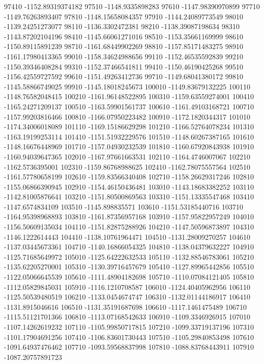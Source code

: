 {97410 -1152.89319374182
97510 -1148.9335898283
97610 -1147.98390970899
97710 -1149.76263893407
97810 -1148.15658084357
97910 -1144.24089773549
98010 -1139.24251273077
98110 -1136.3302472381
98210 -1138.39087198634
98310 -1143.87202104196
98410 -1145.66061271016
98510 -1153.35661169999
98610 -1150.89115891239
98710 -1161.68449902269
98810 -1157.85171483275
98910 -1161.17980413365
99010 -1158.34624988656
99110 -1152.46535592839
99210 -1150.39346408284
99310 -1152.37466541811
99410 -1150.46190425268
99510 -1156.42559727592
99610 -1151.49263412736
99710 -1149.68041380172
99810 -1145.58866749025
99910 -1145.18018245673
100010 -1149.83679132225
100110 -1148.76582048415
100210 -1161.96148522895
100310 -1159.63559274001
100410 -1165.24271209137
100510 -1163.59901561737
100610 -1161.49103168721
100710 -1157.99203816466
100810 -1166.07950223482
100910 -1172.1820344317
101010 -1174.34006018089
101110 -1169.15186629298
101210 -1166.52764078234
101310 -1163.19199253114
101410 -1151.51932229576
101510 -1148.60267387165
101610 -1148.16676448969
101710 -1157.04930232539
101810 -1160.67920843938
101910 -1160.94039647365
102010 -1167.97661663531
102110 -1164.4746007067
102210 -1162.5736395001
102310 -1159.86768988625
102410 -1162.78075557564
102510 -1161.57780658199
102610 -1159.83566340408
102710 -1158.26629317246
102810 -1155.06866390945
102910 -1154.46150436481
103010 -1143.18683382252
103110 -1142.81005876641
103210 -1151.80500869563
103310 -1151.13335547468
103410 -1147.6574834109
103510 -1145.898835571
103610 -1151.53185440716
103710 -1164.95398968893
103810 -1161.87356957168
103910 -1157.95822957249
104010 -1156.50609135034
104110 -1151.82875288926
104210 -1147.50596873897
104310 -1146.1222614443
104410 -1138.10761964471
104510 -1131.28009270257
104610 -1137.03445673361
104710 -1140.16866054325
104810 -1138.04379632227
104910 -1125.71685649972
105010 -1125.64222632533
105110 -1132.88546783061
105210 -1135.62205270001
105310 -1130.39716457679
105410 -1127.89965442856
105510 -1122.05066645539
105610 -1111.48904182698
105710 -1110.07084121405
105810 -1112.05829845031
105910 -1116.1210708587
106010 -1124.40405962956
106110 -1125.50539480519
106210 -1133.0454674747
106310 -1132.01144186917
106410 -1131.8915046616
106510 -1131.35191687698
106610 -1117.1461475489
106710 -1115.51121701366
106810 -1113.07168542633
106910 -1109.3346926915
107010 -1107.14262619232
107110 -1105.99850717815
107210 -1099.33719137196
107310 -1101.17904691256
107410 -1106.83601730443
107510 -1105.29840853498
107610 -1091.64937476462
107710 -1093.59568837998
107810 -1088.83768443911
107910 -1087.20757891723
}
